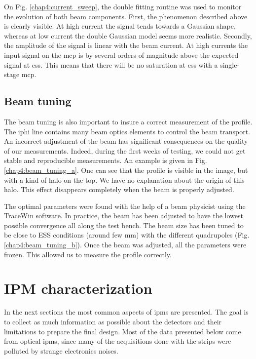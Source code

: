 \begin{refsection}
  

  On Fig. \ref{chap4:current_sweep}, the double fitting routine was used to monitor the evolution of both beam components. First, the phenomenon described above is clearly visible. At high current the signal tends towards a Gaussian shape, whereas at low current the double Gaussian model seems more realistic. Secondly, the amplitude of the signal is linear with the beam current. At high currents the input signal on the \acrshort{mcp} is by several orders of magnitude above the expected signal at \acrshort{ess}. This means that there will be no saturation at \acrshort{ess} with a single-stage \acrshort{mcp}.

  \subsection{Beam tuning}

  The beam tuning is also important to insure a correct measurement of the profile. The \acrshort{iphi} line contains many beam optics elements to control the beam transport. An incorrect adjustment of the beam has significant consequences on the quality of our measurements. Indeed, during the first weeks of testing, we could not get stable and reproducible measurements. An example is given in Fig. \ref{chap4:beam_tuning_a}. One can see that the profile is visible in the image, but with a kind of halo on the top. We have no explanation about the origin of this halo. This effect disappears completely when the beam is properly adjusted.

  The optimal parameters were found with the help of a beam physicist using the TraceWin software. In practice, the beam has been adjusted to have the lowest possible convergence all along the test bench. The beam size has been tuned to be close to ESS conditions (around few $\mathrm{mm}$) with the different quadrupoles (Fig. \ref{chap4:beam_tuning_b}). Once the beam was adjusted, all the parameters were frozen. This allowed us to measure the profile correctly.

  


  \section{IPM characterization}
  In the next sections the most common aspects of \acrshort{ipm}s are presented. The goal is to collect as much information as possible about the detectors and their limitations to prepare the final design. Most of the data presented below come from optical \acrshort{ipm}s, since many of the acquisitions done with the strips were polluted by strange electronics noises.


\end{refsection}
